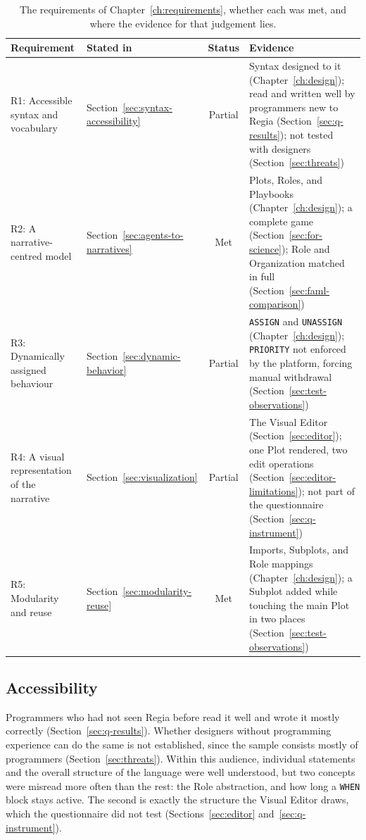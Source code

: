 \begin{table}[htpb]
\centering
\small
\begin{tabular}{|p{3.9cm}|p{1.6cm}|c|p{6.0cm}|}
\hline
\textbf{Requirement} & \textbf{Stated in} & \textbf{Status} & \textbf{Evidence} \\
\hline
R1: Accessible syntax and vocabulary
 & Section~\ref{sec:syntax-accessibility} & Partial
 & Syntax designed to it (Chapter~\ref{ch:design}); read and written well by programmers new to Regia (Section~\ref{sec:q-results}); not tested with designers (Section~\ref{sec:threats}) \\
\hline
R2: A narrative-centred model
 & Section~\ref{sec:agents-to-narratives} & Met
 & Plots, Roles, and Playbooks (Chapter~\ref{ch:design}); a complete game (Section~\ref{sec:for-science}); Role and Organization matched in full (Section~\ref{sec:faml-comparison}) \\
\hline
R3: Dynamically assigned behaviour
 & Section~\ref{sec:dynamic-behavior} & Partial
 & \lstinline|ASSIGN| and \lstinline|UNASSIGN| (Chapter~\ref{ch:design}); \lstinline|PRIORITY| not enforced by the platform, forcing manual withdrawal (Section~\ref{sec:test-observations}) \\
\hline
R4: A visual representation of the narrative
 & Section~\ref{sec:visualization} & Partial
 & The Visual Editor (Section~\ref{sec:editor}); one Plot rendered, two edit operations (Section~\ref{sec:editor-limitations}); not part of the questionnaire (Section~\ref{sec:q-instrument}) \\
\hline
R5: Modularity and reuse
 & Section~\ref{sec:modularity-reuse} & Met
 & Imports, Subplots, and Role mappings (Chapter~\ref{ch:design}); a Subplot added while touching the main Plot in two places (Section~\ref{sec:test-observations}) \\
\hline
\end{tabular}
\caption{The requirements of Chapter~\ref{ch:requirements}, whether each was met, and where the evidence for that judgement lies.}
\label{tab:requirements-status}
\end{table}
 
\subsection{Accessibility}
\label{sec:discussion-accessibility}
 
Programmers who had not seen Regia before read it well and wrote it mostly correctly (Section~\ref{sec:q-results}). Whether designers without programming experience can do the same is not established, since the sample consists mostly of programmers (Section~\ref{sec:threats}). Within this audience, individual statements and the overall structure of the language were well understood, but two concepts were misread more often than the rest: the Role abstraction, and how long a \lstinline|WHEN| block stays active. The second is exactly the structure the Visual Editor draws, which the questionnaire did not test (Sections~\ref{sec:editor} and~\ref{sec:q-instrument}).

